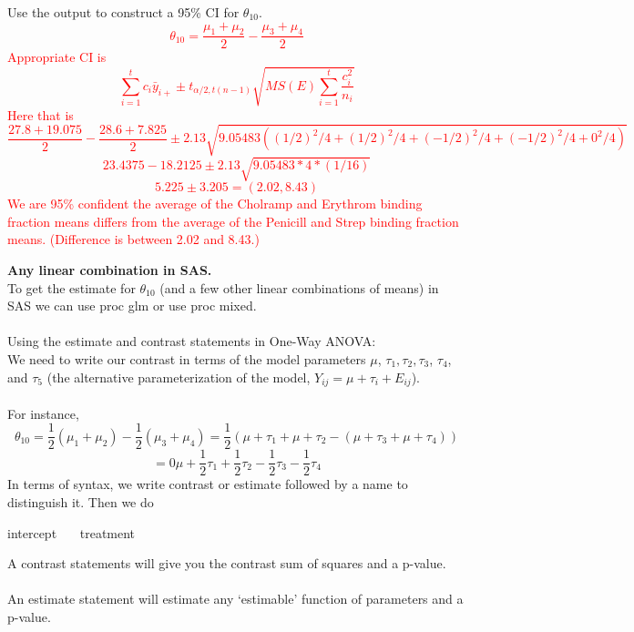 Use the output to construct a 95\% CI for $\theta_{10}$.
\textcolor{red}{$$\theta_{10}=\frac{\mu_1+\mu_2}{2}-\frac{\mu_3+\mu_4}{2}$$
Appropriate CI is 
$$\sum_{i=1}^{t}c_{i}\bar{y}_{i+}\pm t_{\alpha/2,t(n-1)}\sqrt{MS(E)\sum_{i=1}^{t}\frac{c_{i}^2}{n_{i}}}$$
Here that is
$$\frac{27.8+19.075}{2}-\frac{28.6+7.825}{2}\pm 2.13 \sqrt{9.05483\left((1/2)^2/4+(1/2)^2/4+(-1/2)^2/4+(-1/2)^2/4+0^2/4\right)}$$
$$23.4375-18.2125\pm 2.13\sqrt{9.05483*4*(1/16)}$$
$$5.225\pm 3.205=(2.02,8.43)$$
We are 95\% confident the average of the Cholramp and Erythrom binding fraction means differs from the average of the Penicill and Strep binding fraction means.  (Difference is between 2.02 and 8.43.)}

\newpage
\textbf{Any linear combination in SAS.}\\
To get the estimate for $\theta_{10}$ (and a few other linear combinations of means) in SAS we can use proc glm or use proc mixed.\\~\\

Using the estimate and contrast statements in One-Way ANOVA:\\
We need to write our contrast in terms of the model parameters $\mu$, $\tau_1, \tau_2,\tau_3$, $\tau_4$, and $\tau_5$ (the alternative parameterization of the model, $Y_{ij}=\mu+\tau_i+E_{ij}$). \\~\\

For instance, 
$$\theta_{10}=\frac{1}{2}(\mu_1+\mu_2)-\frac{1}{2}(\mu_3+\mu_4)=\frac{1}{2}(\mu+\tau_1+\mu+\tau_2-(\mu+\tau_3+\mu+\tau_4))$$
$$=0\mu+\frac{1}{2}\tau_1+\frac{1}{2}\tau_2-\frac{1}{2}\tau_3-\frac{1}{2}\tau_4$$
In terms of syntax, we write contrast or estimate followed by a name to distinguish it.  Then we do
\begin{center}
intercept ~~~treatment ~~~~~~~~~
\end{center}
A contrast statements will give you the contrast sum of squares and a p-value.\\~\\
An estimate statement will estimate any `estimable' function of parameters and a p-value. \\~\\~\\



